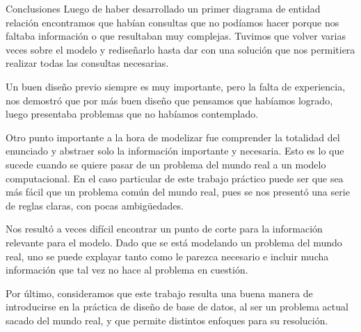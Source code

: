 \begin{section}{Conclusiones}
Luego de haber desarrollado un primer diagrama de entidad relación encontramos que habían consultas que no podíamos hacer porque nos faltaba información o que resultaban muy complejas. Tuvimos que volver varias veces sobre el modelo y rediseñarlo hasta dar con una solución que nos permitiera realizar todas las consultas necesarias. 

Un buen diseño previo siempre es muy importante, pero la falta de experiencia, nos demostró que por más buen diseño que pensamos que habíamos logrado, luego presentaba problemas que no habíamos contemplado.

Otro punto importante a la hora de modelizar fue comprender la totalidad del enunciado y abstraer solo la información importante y necesaria. Esto es lo que sucede cuando se quiere pasar de un problema del mundo real a un modelo computacional. En el caso particular de este trabajo práctico puede ser que sea más fácil que un problema común del mundo real, pues se nos presentó una serie de reglas claras, con pocas ambigüedades. 

Nos resultó a veces difícil encontrar un punto de corte para la información relevante para el modelo. Dado que se está modelando un problema del mundo real, uno se puede explayar tanto como le parezca necesario e incluir mucha información que tal vez no hace al problema en cuestión.

Por último, consideramos que este trabajo resulta una buena manera de introducirse en la práctica de diseño de base de datos, al ser un problema actual sacado del mundo real, y que permite distintos enfoques para su resolución.
\end{section}